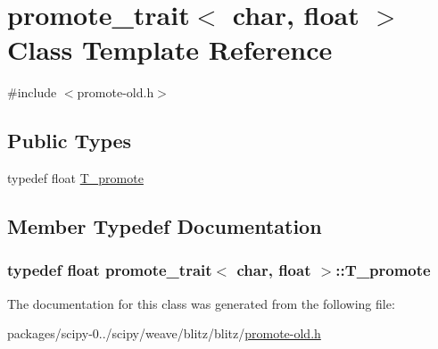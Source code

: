 \hypertarget{classpromote__trait_3_01char_00_01float_01_4}{}\section{promote\+\_\+trait$<$ char, float $>$ Class Template Reference}
\label{classpromote__trait_3_01char_00_01float_01_4}


{\ttfamily \#include $<$promote-\/old.\+h$>$}

\subsection*{Public Types}
\begin{DoxyCompactItemize}
\item 
typedef float \hyperlink{classpromote__trait_3_01char_00_01float_01_4_a9258530c7d8d32b0c02a718c85ab327e}{T\+\_\+promote}
\end{DoxyCompactItemize}


\subsection{Member Typedef Documentation}
\hypertarget{classpromote__trait_3_01char_00_01float_01_4_a9258530c7d8d32b0c02a718c85ab327e}{}
\subsubsection[{T\+\_\+promote}]{\setlength{\rightskip}{0pt plus 5cm}typedef float {\bf promote\+\_\+trait}$<$ char, float $>$\+::{\bf T\+\_\+promote}}\label{classpromote__trait_3_01char_00_01float_01_4_a9258530c7d8d32b0c02a718c85ab327e}


The documentation for this class was generated from the following file\+:\begin{DoxyCompactItemize}
\item 
packages/scipy-\/0../scipy/weave/blitz/blitz/\hyperlink{promote-old_8h}{promote-\/old.\+h}\end{DoxyCompactItemize}
